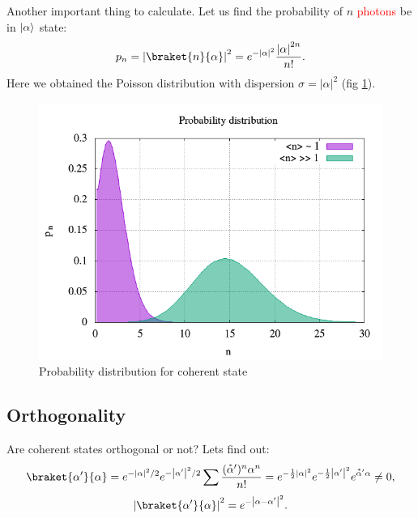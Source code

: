 Another important thing to calculate. Let us find the probability of $n$ {\textcolor{red}{photons}} be in $\lvert\alpha\rangle$ state:
\begin{equation}
	p_n = \left| \braket{n}{\alpha} \right|^2 = e^{- \left|\alpha\right|^2} \frac{\left|\alpha\right|^{2n}}{n!}.
\end{equation}
Here we obtained the Poisson distribution with dispersion $\sigma = \left|\alpha\right|^2$ (fig \ref{fig:2_1}).
\begin{figure}
	\centering
	\includegraphics[width=0.7\linewidth]{fig/L2/2_1}
	\caption{Probability distribution for coherent state}
	\label{fig:2_1}
\end{figure}

\subsection{Orthogonality}

Are coherent states orthogonal or not? Lets find out:
\begin{equation}
	\braket{\alpha'}{\alpha} = e^{- \left|\alpha\right|^2/2} e^{- \left|\alpha'\right|^2/2} \sum \frac{( \accentset{\ast}{\alpha}' )^n \alpha^n}{n!} = e^{-\frac{1}{2} \left|\alpha\right|^2} e^{-\frac{1}{2} \left|\alpha'\right|^2 } e^{\accentset{\ast}{\alpha}' \alpha} \neq 0,
\end{equation}
\begin{equation}
	\left|\braket{\alpha'}{\alpha}\right|^2 = e^{- \left| \alpha - \alpha' \right|^2}.
\end{equation}



